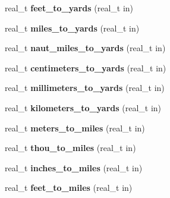 \begin{DoxyCompactItemize}
\item 
\hypertarget{namespaceetk_a0a37f195cddec05a991bfaefd3f7166b}{real\-\_\-t {\bfseries feet\-\_\-to\-\_\-yards} (real\-\_\-t in)}\label{namespaceetk_a0a37f195cddec05a991bfaefd3f7166b}

\item 
\hypertarget{namespaceetk_a6108c39246b0a67f22dc63bf5e2579cc}{real\-\_\-t {\bfseries miles\-\_\-to\-\_\-yards} (real\-\_\-t in)}\label{namespaceetk_a6108c39246b0a67f22dc63bf5e2579cc}

\item 
\hypertarget{namespaceetk_a60f2395b9b78ccdaab45c3b8ce91cc26}{real\-\_\-t {\bfseries naut\-\_\-miles\-\_\-to\-\_\-yards} (real\-\_\-t in)}\label{namespaceetk_a60f2395b9b78ccdaab45c3b8ce91cc26}

\item 
\hypertarget{namespaceetk_a49aa0478e0bb236f2e880e8b0768d262}{real\-\_\-t {\bfseries centimeters\-\_\-to\-\_\-yards} (real\-\_\-t in)}\label{namespaceetk_a49aa0478e0bb236f2e880e8b0768d262}

\item 
\hypertarget{namespaceetk_ae57725fed973849e9b9b4afbdc7e8205}{real\-\_\-t {\bfseries millimeters\-\_\-to\-\_\-yards} (real\-\_\-t in)}\label{namespaceetk_ae57725fed973849e9b9b4afbdc7e8205}

\item 
\hypertarget{namespaceetk_aa0260a4ba8f8c70aab6a18edf621dd4c}{real\-\_\-t {\bfseries kilometers\-\_\-to\-\_\-yards} (real\-\_\-t in)}\label{namespaceetk_aa0260a4ba8f8c70aab6a18edf621dd4c}

\item 
\hypertarget{namespaceetk_a31134544d80fbfd63475ec1ee9b34879}{real\-\_\-t {\bfseries meters\-\_\-to\-\_\-miles} (real\-\_\-t in)}\label{namespaceetk_a31134544d80fbfd63475ec1ee9b34879}

\item 
\hypertarget{namespaceetk_a615bb34ada6c7f0a95f19db3afd172fe}{real\-\_\-t {\bfseries thou\-\_\-to\-\_\-miles} (real\-\_\-t in)}\label{namespaceetk_a615bb34ada6c7f0a95f19db3afd172fe}

\item 
\hypertarget{namespaceetk_a788a33d62943e759cd78fb01853a8376}{real\-\_\-t {\bfseries inches\-\_\-to\-\_\-miles} (real\-\_\-t in)}\label{namespaceetk_a788a33d62943e759cd78fb01853a8376}

\item 
\hypertarget{namespaceetk_a2596779fc75cea264cef3e2c24c547cd}{real\-\_\-t {\bfseries feet\-\_\-to\-\_\-miles} (real\-\_\-t in)}\label{namespaceetk_a2596779fc75cea264cef3e2c24c547cd}


\end{DoxyCompactItemize}
